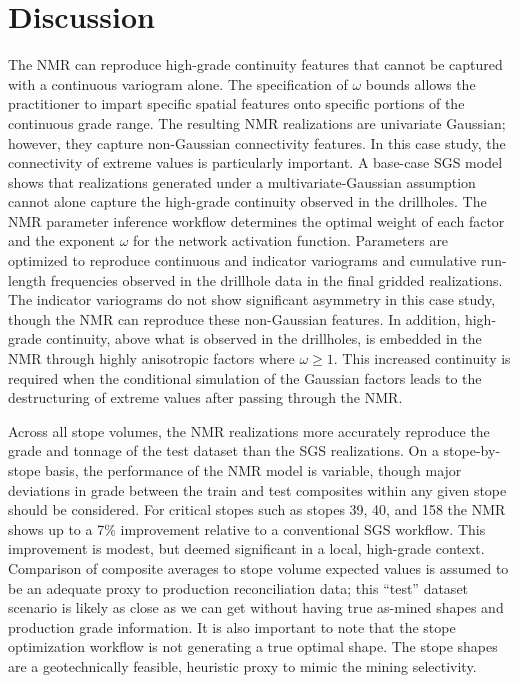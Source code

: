 \FloatBarrier
\section{Discussion}
\label{sec:06discuss}

The \gls{NMR} can reproduce high-grade continuity features that cannot be captured with a continuous variogram alone. The specification of $\omega$ bounds allows the practitioner to impart specific spatial features onto specific portions of the continuous grade range. The resulting \gls{NMR} realizations are univariate Gaussian; however, they capture non-Gaussian connectivity features. In this case study, the connectivity of extreme values is particularly important. A base-case \gls{SGS} model shows that realizations generated under a multivariate-Gaussian assumption cannot alone capture the high-grade continuity observed in the drillholes. The \gls{NMR} parameter inference workflow determines the optimal weight of each factor and the exponent $\omega$ for the network activation function. Parameters are optimized to reproduce continuous and indicator variograms and cumulative run-length frequencies observed in the drillhole data in the final gridded realizations. The indicator variograms do not show significant asymmetry in this case study, though the \gls{NMR} can reproduce these non-Gaussian features. In addition, high-grade continuity, above what is observed in the drillholes, is embedded in the \gls{NMR} through highly anisotropic factors where $\omega \ge 1$. This increased continuity is required when the conditional simulation of the Gaussian factors leads to the destructuring of extreme values after passing through the \gls{NMR}.

Across all stope volumes, the \gls{NMR} realizations more accurately reproduce the grade and tonnage of the test dataset than the \gls{SGS} realizations. On a stope-by-stope basis, the performance of the \gls{NMR} model is variable, though major deviations in grade between the train and test composites within any given stope should be considered. For critical stopes such as stopes 39, 40, and 158 the \gls{NMR} shows up to a 7\% improvement relative to a conventional \gls{SGS} workflow. This improvement is modest, but deemed significant in a local, high-grade context. Comparison of composite averages to stope volume expected values is assumed to be an adequate proxy to production reconciliation data; this ``test'' dataset scenario is likely as close as we can get without having true as-mined shapes and production grade information. It is also important to note that the stope optimization workflow is not generating a true optimal shape. The stope shapes are a geotechnically feasible, heuristic proxy to mimic the mining selectivity.


